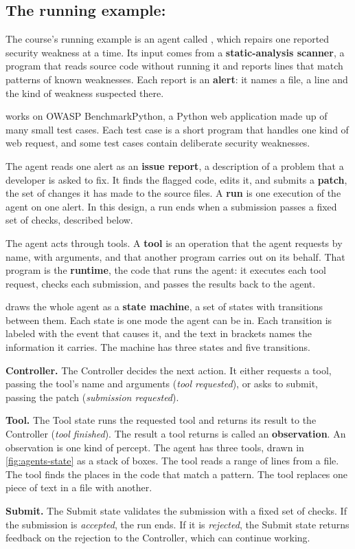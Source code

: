 \subsection{The running example: \msa{}}
\label{sec:agents-msa}

The course's running example is an agent called \msa{}, which repairs one reported security
weakness at a time. Its input comes from a \textbf{static-analysis scanner}, a program that reads
source code without running it and reports lines that match patterns of known weaknesses. Each
report is an \textbf{alert}: it names a file, a line and the kind of weakness suspected there.

\msa{} works on OWASP Benchmark\-Python, a Python web application made up of many small test cases.
Each test case is a short program that handles one kind of web request, and some test cases contain
deliberate security weaknesses.

The agent reads one alert as an \textbf{issue report}, a description of a problem that a developer
is asked to fix. It finds the flagged code, edits it, and submits a \textbf{patch}, the set of
changes it has made to the source files. A \textbf{run} is one execution of the agent on one alert.
In this design, a run ends when a submission passes a fixed set of checks, described below.

The agent acts through tools. A \textbf{tool} is an operation that the agent requests by name, with
arguments, and that another program carries out on its behalf. That program is the
\textbf{runtime}, the code that runs the agent: it executes each tool request, checks each
submission, and passes the results back to the agent.

 draws the whole agent as a \textbf{state machine}, a set of states with
transitions between them. Each state is one mode the agent can be in. Each transition is labeled
with the event that causes it, and the text in brackets names the information it carries. The
machine has three states and five transitions.
\bi
\item \textbf{Controller.} The Controller decides the next action. It either requests a tool,
passing the tool's name and arguments (\emph{tool requested}), or asks to submit, passing the
patch (\emph{submission requested}).
\item \textbf{Tool.} The Tool state runs the requested tool and returns its result to the
Controller (\emph{tool finished}). The result a tool returns is called an \textbf{observation}. An
observation is one kind of percept. The agent has three tools, drawn in \cref{fig:agents-state} as
a stack of boxes. The tool  reads a range of lines from a file. The tool
 finds the places in the code that match a pattern. The tool 
replaces one piece of text in a file with another.
\item \textbf{Submit.} The Submit state validates the submission with a fixed set of checks. If
the submission is \emph{accepted}, the run ends. If it is \emph{rejected}, the Submit state returns
feedback on the rejection to the Controller, which can continue working.
\ei

